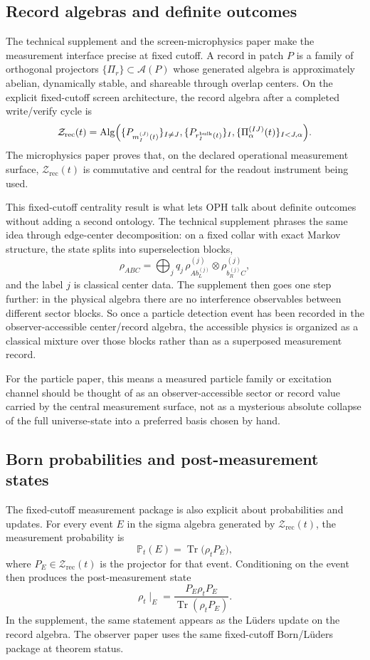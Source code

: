 \documentclass[11pt]{article}
\begin{document}
\subsection{Record algebras and definite outcomes}

The technical supplement and the screen-microphysics paper make the measurement
interface precise at fixed cutoff. A record in patch \(P\) is a family of orthogonal projectors
\(\{\Pi_r\}\subset\mathcal A(P)\) whose generated algebra is approximately abelian, dynamically
stable, and shareable through overlap centers. On the explicit fixed-cutoff screen architecture,
the record algebra after a completed write/verify cycle is
\[
\mathcal Z_{\mathrm{rec}}(t)
=
\mathrm{Alg}\Bigl(
\{P_{m_I^{(J)}(t)}\}_{I\neq J},
\{P_{r_I^{\mathrm{bulk}}(t)}\}_I,
\{\Pi_\alpha^{(IJ)}(t)\}_{I<J,\alpha}
\Bigr).
\]
The microphysics paper proves that, on the declared operational measurement surface,
\(\mathcal Z_{\mathrm{rec}}(t)\) is commutative and central for the readout instrument being
used.

This fixed-cutoff centrality result is what lets OPH talk about definite outcomes without adding
a second ontology. The technical supplement phrases the same idea through edge-center
decomposition: on a fixed collar with exact Markov structure, the state splits into
superselection blocks,
\[
\rho_{ABC}
=
\bigoplus_j
q_j\,
\rho^{(j)}_{A b_L^{(j)}}\otimes \rho^{(j)}_{b_R^{(j)} C},
\]
and the label \(j\) is classical center data. The supplement then goes one step further: in the
physical algebra there are no interference observables between different sector blocks. So once a
particle detection event has been recorded in the observer-accessible center/record algebra, the
accessible physics is organized as a classical mixture over those blocks rather than as a
superposed measurement record.

For the particle paper, this means a measured particle family or excitation channel should be
thought of as an observer-accessible sector or record value carried by the central measurement
surface, not as a mysterious absolute collapse of the full universe-state into a preferred basis
chosen by hand.

\subsection{Born probabilities and post-measurement states}

The fixed-cutoff measurement package is also explicit about probabilities and updates. For every
event \(E\) in the sigma algebra generated by \(\mathcal Z_{\mathrm{rec}}(t)\), the measurement
probability is
\[
\mathbb P_t(E)=\operatorname{Tr}\!\bigl(\rho_t P_E\bigr),
\]
where \(P_E\in\mathcal Z_{\mathrm{rec}}(t)\) is the projector for that event. Conditioning on the
event then produces the post-measurement state
\[
\rho_t\!\mid_E
=
\frac{P_E\rho_t P_E}{\operatorname{Tr}(\rho_t P_E)}.
\]
In the supplement, the same statement appears as the L\"uders update on the record algebra. The
observer paper uses the same fixed-cutoff Born/L\"uders package at theorem status.
\end{document}
